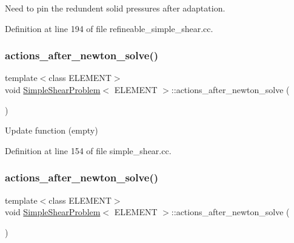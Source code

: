 Need to pin the redundent solid pressures after adaptation. 



Definition at line 194 of file refineable\+\_\+simple\+\_\+shear.\+cc.

\mbox{\label{classSimpleShearProblem_ab476064967687537e335dfd40d770dbc}} 
\subsubsection{\texorpdfstring{actions\+\_\+after\+\_\+newton\+\_\+solve()}{actions\_after\_newton\_solve()}\hspace{0.1cm}{\footnotesize\ttfamily [1/2]}}
{\footnotesize\ttfamily template$<$class E\+L\+E\+M\+E\+NT$>$ \\
void \hyperlink{classSimpleShearProblem}{Simple\+Shear\+Problem}$<$ E\+L\+E\+M\+E\+NT $>$\+::actions\+\_\+after\+\_\+newton\+\_\+solve (\begin{DoxyParamCaption}{ }\end{DoxyParamCaption})\hspace{0.3cm}{\ttfamily [inline]}}



Update function (empty) 



Definition at line 154 of file simple\+\_\+shear.\+cc.

\mbox{\label{classSimpleShearProblem_ab476064967687537e335dfd40d770dbc}} 
\subsubsection{\texorpdfstring{actions\+\_\+after\+\_\+newton\+\_\+solve()}{actions\_after\_newton\_solve()}\hspace{0.1cm}{\footnotesize\ttfamily [2/2]}}
{\footnotesize\ttfamily template$<$class E\+L\+E\+M\+E\+NT$>$ \\
void \hyperlink{classSimpleShearProblem}{Simple\+Shear\+Problem}$<$ E\+L\+E\+M\+E\+NT $>$\+::actions\+\_\+after\+\_\+newton\+\_\+solve (\begin{DoxyParamCaption}{ }\end{DoxyParamCaption})\hspace{0.3cm}{\ttfamily [inline]}}



